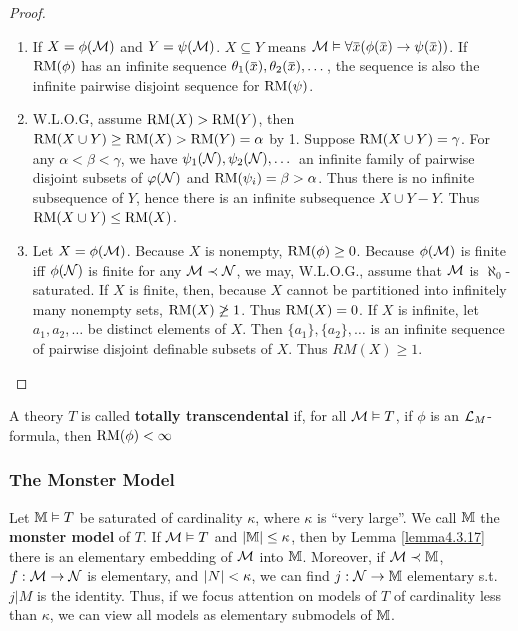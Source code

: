\documentclass[11pt]{article}
\begin{document}
\begin{proof}
\begin{enumerate}
\item If \(X=\phi(\mathcal{M})\) and \(Y=\psi(\mathcal{M})\). \(X\subseteq Y\) means \(\calm\vDash\forall \barx(\phi(\barx)\to\psi(\barx))\). If \(\operatorname{RM}(\phi)\) has an
 infinite sequence \(\theta_1(\barx),\theta_2(\barx),\dots\), the sequence is also the infinite pairwise
disjoint sequence for \(\operatorname{RM}(\psi)\).
\item W.L.O.G, assume \(\operatorname{RM}(X)>\operatorname{RM}(Y)\), then \(\operatorname{RM}(X\cup Y)\ge\operatorname{RM}(X)>\operatorname{RM}(Y)=\alpha\) by 1.
Suppose \(\operatorname{RM}(X\cup Y)=\gamma\). For any \(\alpha<\beta<\gamma\), we have \(\psi_1(\mathcal{N}),\psi_2(\mathcal{N}),\dots\) an infinite family of
pairwise disjoint subsets of \(\varphi(\mathcal{N})\) and \(\operatorname{RM}(\psi_i)=\beta>\alpha\). Thus there is no infinite
subsequence of \(Y\), hence there is an infinite subsequence \(X\cup Y-Y\). Thus \(\operatorname{RM}(X\cup Y)\le \operatorname{RM}(X)\).
\item Let \(X=\phi(\mathcal{M})\). Because \(X\) is nonempty, \(\operatorname{RM}(\phi)\ge 0\). Because \(\phi(\mathcal{M})\) is finite
iff \(\phi(\mathcal{N})\) is finite for any \(\mathcal{M}\prec\mathcal{N}\), we may, W.L.O.G., assume that \(\mathcal{M}\)
is \(\aleph_0\)-saturated. If \(X\) is finite, then, because \(X\) cannot be partitioned into
infinitely many nonempty sets, \(\operatorname{RM}(X)\not\ge 1\). Thus \(\operatorname{RM}(X)=0\). If \(X\) is infinite,
let \(a_1,a_2,\dots\) be distinct elements of \(X\). Then
\(\{a_1\},\{a_2\},\dots\) is an infinite sequence of pairwise disjoint definable subsets of \(X\).
Thus \(RM(X)\ge 1\).
\end{enumerate}
\end{proof}

\begin{definition}[]
A theory \(T\) is called \textbf{totally transcendental} if, for all \(\mathcal{M}\vDash T\), if \(\phi\) is
an \(\mathcal{L}_M\)-formula, then \(\operatorname{RM}(\phi)<\infty\)
\end{definition}
\subsubsection{The Monster Model}
\label{sec:orgb5392f7}
Let \(\mathbb{M}\vDash T\) be saturated of cardinality \(\kappa\), where \(\kappa\) is ``very large''. We call \(\mathbb{M}\) the \textbf{monster
model} of \(T\). If \(\mathcal{M}\vDash T\) and \(\abs{\M}\le\kappa\), then by Lemma \ref{lemma4.3.17} there is an
elementary embedding of \(\mathcal{M}\) into \(\mathbb{M}\). Moreover, if \(\mathcal{M}\prec\mathbb{M}\), \(f:\mathcal{M}\to\mathcal{N}\) is elementary,
and \(\abs{N}<\kappa\), we can find \(j:\mathcal{N}\to\mathbb{M}\) elementary s.t. \(j|M\) is the identity. Thus, if we
focus attention on models of \(T\) of cardinality less than \(\kappa\), we can view all models as
elementary submodels of \(\mathbb{M}\).
\end{document}
